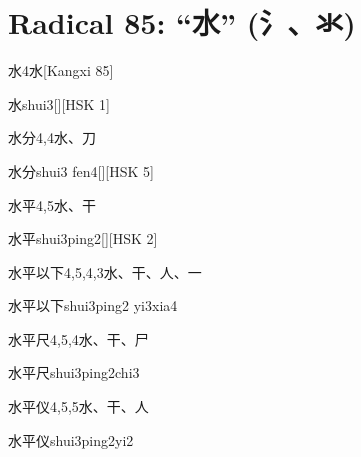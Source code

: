 
\section*{Radical 85: ``⽔'' (氵、氺)}

\begin{entry}{水}{4}{⽔}[Kangxi 85]
  \begin{phonetics}{水}{shui3}[][HSK 1]
  \end{phonetics}
\end{entry}

\begin{entry}{水分}{4,4}{⽔、⼑}
  \begin{phonetics}{水分}{shui3 fen4}[][HSK 5]
  \end{phonetics}
\end{entry}

\begin{entry}{水平}{4,5}{⽔、⼲}
  \begin{phonetics}{水平}{shui3ping2}[][HSK 2]
  \end{phonetics}
\end{entry}

\begin{entry}{水平以下}{4,5,4,3}{⽔、⼲、⼈、⼀}
  \begin{phonetics}{水平以下}{shui3ping2 yi3xia4}
  \end{phonetics}
\end{entry}

\begin{entry}{水平尺}{4,5,4}{⽔、⼲、⼫}
  \begin{phonetics}{水平尺}{shui3ping2chi3}
  \end{phonetics}
\end{entry}

\begin{entry}{水平仪}{4,5,5}{⽔、⼲、⼈}
  \begin{phonetics}{水平仪}{shui3ping2yi2}
  \end{phonetics}
\end{entry}

